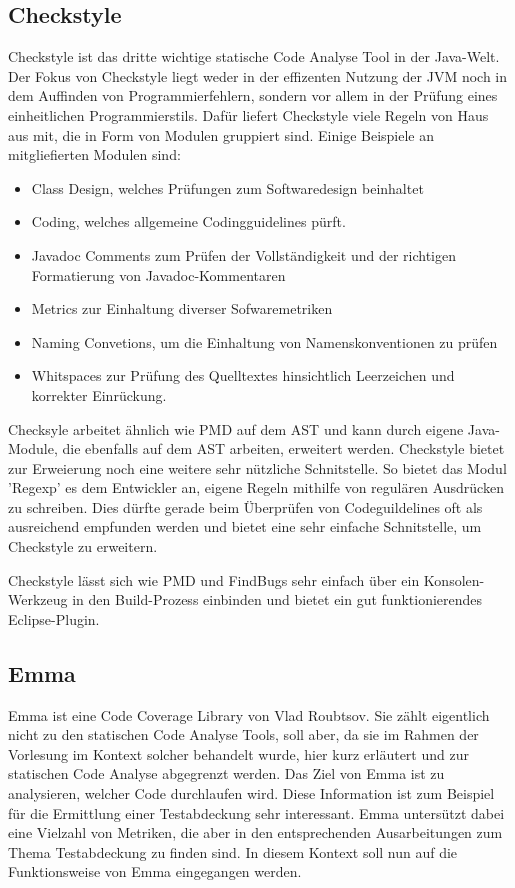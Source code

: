\subsection{Checkstyle}

Checkstyle ist das dritte wichtige statische Code Analyse Tool in der Java-Welt. Der Fokus von Checkstyle liegt weder in der effizenten Nutzung der JVM noch in dem Auffinden von Programmierfehlern, sondern vor allem in der Prüfung eines einheitlichen Programmierstils. 
Dafür liefert Checkstyle viele Regeln von Haus aus mit, die in Form von Modulen gruppiert sind. Einige Beispiele an mitgliefierten Modulen sind:
\begin{itemize}
\item Class Design, welches Prüfungen zum Softwaredesign beinhaltet
\item Coding, welches allgemeine Codingguidelines pürft.
\item Javadoc Comments zum Prüfen der Vollständigkeit und der richtigen Formatierung von Javadoc-Kommentaren
\item Metrics zur Einhaltung diverser Sofwaremetriken
\item Naming Convetions, um die Einhaltung von Namenskonventionen zu prüfen
\item Whitspaces zur Prüfung des Quelltextes hinsichtlich Leerzeichen und korrekter Einrückung.
\end{itemize}
Checksyle arbeitet ähnlich wie PMD auf dem AST und kann durch eigene Java-Module, die ebenfalls auf dem AST arbeiten, erweitert werden. Checkstyle bietet zur Erweierung noch eine weitere sehr nützliche Schnitstelle. So bietet das Modul 'Regexp' es dem Entwickler an, eigene Regeln mithilfe von regulären Ausdrücken zu schreiben. Dies dürfte gerade beim Überprüfen von Codeguildelines oft als ausreichend empfunden werden und bietet eine sehr einfache Schnitstelle, um Checkstyle zu erweitern.

Checkstyle lässt sich wie PMD und FindBugs sehr einfach über ein Konsolen-Werkzeug in den Build-Prozess einbinden und bietet ein gut funktionierendes Eclipse-Plugin.


\subsection{Emma}

Emma ist eine Code Coverage Library von Vlad Roubtsov. Sie zählt eigentlich nicht zu den statischen Code Analyse Tools, soll aber, da sie im Rahmen der Vorlesung im Kontext solcher behandelt wurde, hier kurz erläutert und zur statischen Code Analyse abgegrenzt werden. 
Das Ziel von Emma ist zu analysieren, welcher Code durchlaufen wird. Diese Information ist zum Beispiel für die Ermittlung einer Testabdeckung sehr interessant. Emma untersützt dabei eine Vielzahl von Metriken, die aber in den entsprechenden Ausarbeitungen zum Thema Testabdeckung zu finden sind. In diesem Kontext soll nun auf die Funktionsweise von Emma eingegangen werden.

